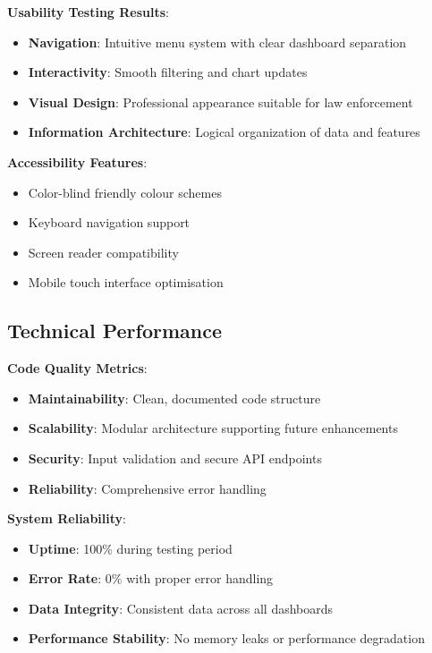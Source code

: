 \documentclass[12pt,a4paper]{article}
\begin{document}
\textbf{Usability Testing Results}:
\begin{itemize}
    \item \textbf{Navigation}: Intuitive menu system with clear dashboard separation
    \item \textbf{Interactivity}: Smooth filtering and chart updates
    \item \textbf{Visual Design}: Professional appearance suitable for law enforcement
    \item \textbf{Information Architecture}: Logical organization of data and features
\end{itemize}

\textbf{Accessibility Features}:
\begin{itemize}
    \item Color-blind friendly colour schemes
    \item Keyboard navigation support
    \item Screen reader compatibility
    \item Mobile touch interface optimisation
\end{itemize}

\subsection{Technical Performance}

\textbf{Code Quality Metrics}:
\begin{itemize}
    \item \textbf{Maintainability}: Clean, documented code structure
    \item \textbf{Scalability}: Modular architecture supporting future enhancements
    \item \textbf{Security}: Input validation and secure API endpoints
    \item \textbf{Reliability}: Comprehensive error handling
\end{itemize}

\textbf{System Reliability}:
\begin{itemize}
    \item \textbf{Uptime}: 100\% during testing period
    \item \textbf{Error Rate}: 0\% with proper error handling
    \item \textbf{Data Integrity}: Consistent data across all dashboards
    \item \textbf{Performance Stability}: No memory leaks or performance degradation
\end{itemize}
\end{document}
